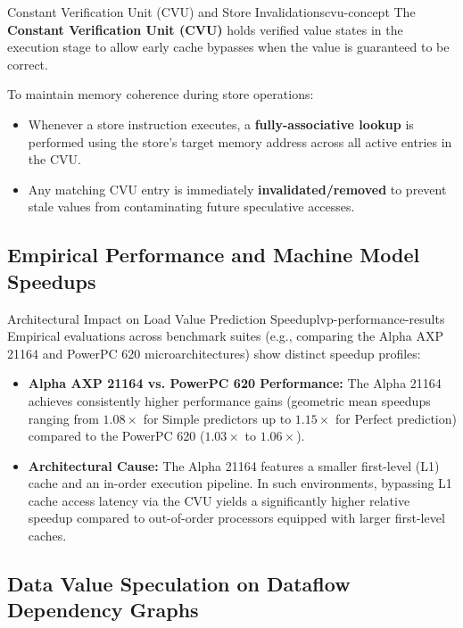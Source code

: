 \begin{concept}{Constant Verification Unit (CVU) and Store Invalidations}{cvu-concept}
The \textbf{Constant Verification Unit (CVU)} holds verified value states in the execution stage to allow early cache bypasses when the value is guaranteed to be correct.

To maintain memory coherence during store operations:
\begin{itemize}
    \item Whenever a store instruction executes, a \textbf{fully-associative lookup} is performed using the store's target memory address across all active entries in the CVU.
    \item Any matching CVU entry is immediately \textbf{invalidated/removed} to prevent stale values from contaminating future speculative accesses.
\end{itemize}
\end{concept}

\subsection{Empirical Performance and Machine Model Speedups}

\begin{observation}{Architectural Impact on Load Value Prediction Speedup}{lvp-performance-results}
Empirical evaluations across benchmark suites (e.g., comparing the Alpha AXP 21164 and PowerPC 620 microarchitectures) show distinct speedup profiles:
\begin{itemize}
    \item \textbf{Alpha AXP 21164 vs. PowerPC 620 Performance:} The Alpha 21164 achieves consistently higher performance gains (geometric mean speedups ranging from $1.08\times$ for Simple predictors up to $1.15\times$ for Perfect prediction) compared to the PowerPC 620 ($1.03\times$ to $1.06\times$).
    \item \textbf{Architectural Cause:} The Alpha 21164 features a smaller first-level (L1) cache and an in-order execution pipeline. In such environments, bypassing L1 cache access latency via the CVU yields a significantly higher relative speedup compared to out-of-order processors equipped with larger first-level caches.
\end{itemize}
\end{observation}

\subsection{Data Value Speculation on Dataflow Dependency Graphs}

